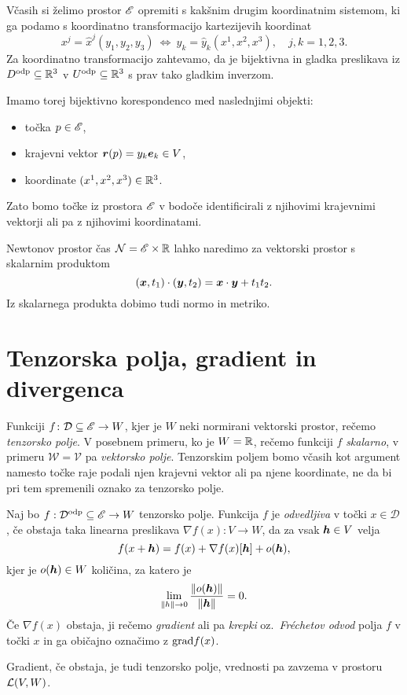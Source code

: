 Včasih si želimo prostor $\mathscr E$ opremiti s kakšnim drugim koordinatnim sistemom, ki ga podamo
s koordinatno transformacijo kartezijevih koordinat
\begin{equation}\label{e:kt}
	x^j = \hat{x}^j(y_1,y_2,y_3) \ \Leftrightarrow \ y_k=\hat{y}_k(x^1,x^2,x^3), \quad j,k=1,2,3.
\end{equation}
Za koordinatno transformacijo zahtevamo, da je bijektivna in gladka preslikava iz
$D^{\mathrm{odp}}\subseteq\mathbb R^3$ v $U^{\mathrm{odp}}\subseteq\mathbb R^3$ s prav tako gladkim inverzom.

Imamo torej bijektivno korespondenco med naslednjimi objekti:
\begin{itemize}
	\item točka $p\in\mathscr E$,
	\item krajevni vektor $\boldsymbol r(p)=y_k\boldsymbol e_k\in V$,
	\item koordinate $(x^1,x^2,x^3)\in\mathbb R^3$.
\end{itemize}
Zato bomo točke iz prostora $\mathscr E$ v bodoče identificirali z njihovimi krajevnimi vektorji ali pa z njihovimi koordinatami.

Newtonov prostor čas $\mathcal{N}=\mathscr E\times\mathbb R$ lahko naredimo za vektorski prostor s skalarnim produktom
\[ (\boldsymbol x,t_1)\cdot(\boldsymbol y,t_2) = \boldsymbol x\cdot\boldsymbol y + t_1 t_2. \]
Iz skalarnega produkta dobimo tudi normo in metriko.


\section{Tenzorska polja, gradient in divergenca}


Funkciji $f\colon\mathcal{D}\subseteq\mathscr E\to W$, kjer je $W$ neki normirani vektorski prostor, rečemo
\emph{tenzorsko polje}. V posebnem primeru, ko je $W=\mathbb R$, rečemo funkciji $f$ \emph{skalarno},
v primeru $\mathscr{W}=\mathscr{V}$ pa \emph{vektorsko polje}. Tenzorskim poljem bomo včasih kot argument namesto točke raje
podali njen krajevni vektor ali pa njene koordinate, ne da bi pri tem spremenili oznako za tenzorsko polje.

\begin{definicija}
	Naj bo $f:\mathcal{D}^{\mathrm{odp}}\subseteq\mathscr E\to W$ tenzorsko polje. Funkcija $f$ je \emph{odvedljiva}
	v točki $x\in\mathcal{D}$, če obstaja taka linearna preslikava $\nabla f(x):V\to W$, da za vsak $\boldsymbol h\in V$ velja
	\begin{equation*}
		f(x+\boldsymbol h)=f(x)+\nabla f(x)[\boldsymbol h]+o(\boldsymbol h),
	\end{equation*}
	kjer je $o(\boldsymbol h)\in W$ količina, za katero je
	\[ \lim_{\| h\|\to 0}\frac{\|o(\boldsymbol h)\|}{\|\boldsymbol h\|}=0. \]
	Če $\nabla f(x)$ obstaja, ji rečemo \emph{gradient} ali pa \emph{krepki} oz.~\emph{Fréchetov odvod} polja $f$ v točki $x$
	in ga običajno označimo z $\mathrm{grad} f(x)$.
\end{definicija}
Gradient, če obstaja, je tudi tenzorsko polje, vrednosti pa zavzema v prostoru $\mathcal L(V,W)$.

